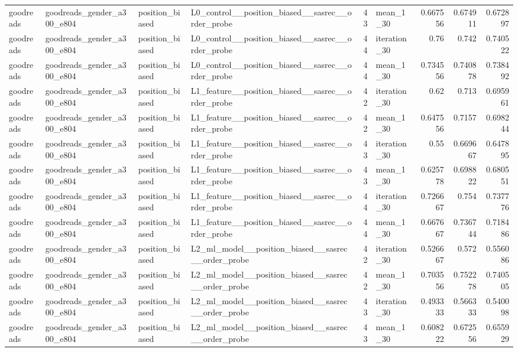 \begin{table}[htbp!]
\begin{tabular}{llllrlrrr}
goodreads & goodreads\_gender\_a300\_e804 & position\_biased & L0\_control\_\_position\_biased\_\_sasrec\_\_order\_probe & 43 & mean\_1\_30 & 0.667556 & 0.674911 & 0.672897 \\
goodreads & goodreads\_gender\_a300\_e804 & position\_biased & L0\_control\_\_position\_biased\_\_sasrec\_\_order\_probe & 44 & iteration\_30 & 0.76 & 0.742 & 0.740522 \\
goodreads & goodreads\_gender\_a300\_e804 & position\_biased & L0\_control\_\_position\_biased\_\_sasrec\_\_order\_probe & 44 & mean\_1\_30 & 0.734556 & 0.740878 & 0.738492 \\
goodreads & goodreads\_gender\_a300\_e804 & position\_biased & L1\_feature\_\_position\_biased\_\_sasrec\_\_order\_probe & 42 & iteration\_30 & 0.62 & 0.713 & 0.695961 \\
goodreads & goodreads\_gender\_a300\_e804 & position\_biased & L1\_feature\_\_position\_biased\_\_sasrec\_\_order\_probe & 42 & mean\_1\_30 & 0.647556 & 0.7157 & 0.698244 \\
goodreads & goodreads\_gender\_a300\_e804 & position\_biased & L1\_feature\_\_position\_biased\_\_sasrec\_\_order\_probe & 43 & iteration\_30 & 0.55 & 0.669667 & 0.647895 \\
goodreads & goodreads\_gender\_a300\_e804 & position\_biased & L1\_feature\_\_position\_biased\_\_sasrec\_\_order\_probe & 43 & mean\_1\_30 & 0.625778 & 0.698822 & 0.680551 \\
goodreads & goodreads\_gender\_a300\_e804 & position\_biased & L1\_feature\_\_position\_biased\_\_sasrec\_\_order\_probe & 44 & iteration\_30 & 0.726667 & 0.754 & 0.737776 \\
goodreads & goodreads\_gender\_a300\_e804 & position\_biased & L1\_feature\_\_position\_biased\_\_sasrec\_\_order\_probe & 44 & mean\_1\_30 & 0.667667 & 0.736744 & 0.718486 \\
goodreads & goodreads\_gender\_a300\_e804 & position\_biased & L2\_ml\_model\_\_position\_biased\_\_sasrec\_\_order\_probe & 42 & iteration\_30 & 0.526667 & 0.572 & 0.556086 \\
goodreads & goodreads\_gender\_a300\_e804 & position\_biased & L2\_ml\_model\_\_position\_biased\_\_sasrec\_\_order\_probe & 42 & mean\_1\_30 & 0.703556 & 0.752278 & 0.740505 \\
goodreads & goodreads\_gender\_a300\_e804 & position\_biased & L2\_ml\_model\_\_position\_biased\_\_sasrec\_\_order\_probe & 43 & iteration\_30 & 0.493333 & 0.566333 & 0.540098 \\
goodreads & goodreads\_gender\_a300\_e804 & position\_biased & L2\_ml\_model\_\_position\_biased\_\_sasrec\_\_order\_probe & 43 & mean\_1\_30 & 0.608222 & 0.672556 & 0.655929 \\

\end{tabular}
\end{table}
